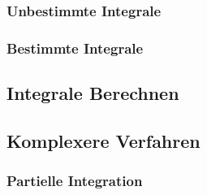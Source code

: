 \documentclass[a4paper, fontsize = 7pt, landscape]{scrartcl}
\begin{document}
\begin{multicols*}{3}
                        
                            \subsubsection{Unbestimmte Integrale}
                                
                                

                            \subsubsection{Bestimmte Integrale}
                                
                                \raggedcolumns
                                \columnbreak
                                \subsection{Integrale Berechnen}
                                
                                
                                \raggedcolumns
                                \columnbreak
                                
                                
                                
                                \raggedcolumns
                                \columnbreak
                                
                            \subsection{Komplexere Verfahren}
                            \subsubsection{Partielle Integration}
                                
                                
                            
                            
                               

\end{multicols*}
\end{document}
